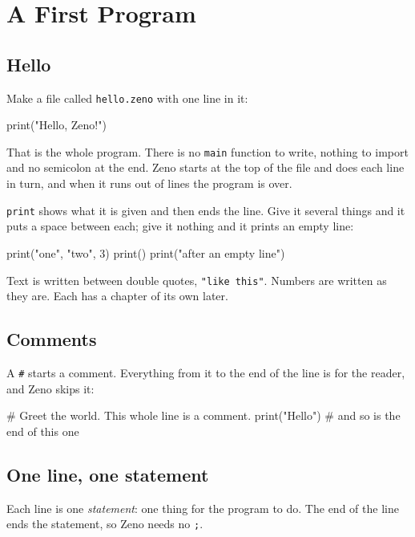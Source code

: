\chapter{A First Program}\label{ch-first-program}

\section{Hello}

Make a file called \verb|hello.zeno| with one line in it:

\begin{zeno}[file=hello.zeno, cmd=zeno run hello.zeno]
print("Hello, Zeno!")
\end{zeno}

That is the whole program. There is no \verb|main| function to write,
nothing to import and no semicolon at the end. Zeno starts at the top
of the file and does each line in turn, and when it runs out of lines
the program is over.

\verb|print| shows what it is given and then ends the line. Give it
several things and it puts a space between each; give it nothing and
it prints an empty line:

\begin{zeno}
print("one", "two", 3)
print()
print("after an empty line")
\end{zeno}

Text is written between double quotes, \verb|"like this"|. Numbers
are written as they are. Each has a chapter of its own later.

\section{Comments}

A \verb|#| starts a comment. Everything from it to the end of the line
is for the reader, and Zeno skips it:

\begin{zeno}
# Greet the world. This whole line is a comment.
print("Hello")   # and so is the end of this one
\end{zeno}

\section{One line, one statement}

Each line is one \emph{statement}: one thing for the program to do.
The end of the line ends the statement, so Zeno needs no \verb|;|.

